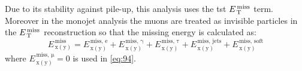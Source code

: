 Due to its stability against pile-up, this analysis uses the \gls{tst} $E_\mathrm{\, T}^\mathrm{\, miss}$
term. Moreover in the monojet analysis the muons are treated as invisible
particles in the $E_\mathrm{\, T}^\mathrm{\, miss}$ reconstruction so that the missing energy is calculated
as:
\begin{equation}
  \label{eq:178}
  E_\mathrm{\, x(y)}^\mathrm{\, miss} = E_\mathrm{\, x(y)}^\mathrm{\, miss,\, e} +
  E_\mathrm{\, x(y)}^\mathrm{\, miss,\, \gamma} + E_\mathrm{\, x(y)}^\mathrm{\,
    miss,\, \tau} + E_\mathrm{\, x(y)}^\mathrm{\, miss,\, \text{jets}} +
  E_\mathrm{\, x(y)}^\mathrm{\, miss,\, \text{soft}}
\end{equation}
where $E_\mathrm{\, x(y)}^\mathrm{\, miss,\, \mu} = 0$ is used in \cref{eq:94}.
